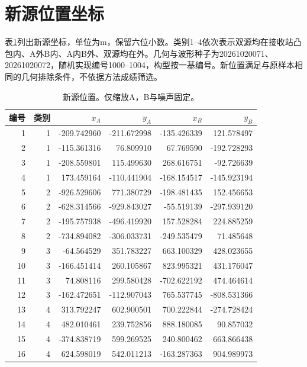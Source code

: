 \documentclass[a4paper,fleqn]{cas-sc}
\begin{document}
\FloatBarrier
\appendix
\FloatBarrier
\section{新源位置坐标}\label{en:coordinates}
表\ref{en:coordinates-table}列出新源坐标，单位为m，保留六位小数。类别1--4依次表示双源均在接收站凸包内、A外B内、A内B外、双源均在外。几何与波形种子为20261020071、20261020072，随机实现编号1000--1004，构型按一基编号。新位置满足与原样本相同的几何排除条件，不依据方法成绩筛选。
\begin{table}[pos=H]\centering
\caption{新源位置。仅缩放A，B与噪声固定。}\label{en:coordinates-table}
\begin{tabular}{@{}rrrrrr@{}}\toprule
编号 & 类别 & $x_A$ & $y_A$ & $x_B$ & $y_B$\\\midrule
1 & 1 & -209.742960 & -211.672998 & -135.426339 & 121.578497\\
2 & 1 & -115.361316 & 76.809910 & 67.769590 & -192.728293\\
3 & 1 & -208.559801 & 115.499630 & 268.616751 & -92.726639\\
4 & 1 & 173.459164 & -110.441904 & -168.154517 & -145.923194\\
5 & 2 & -926.529606 & 771.380729 & -198.481435 & 152.456653\\
6 & 2 & -628.314566 & -929.843027 & -55.519139 & -297.939120\\
7 & 2 & -195.757938 & -496.419920 & 157.528284 & 224.885259\\
8 & 2 & -734.894082 & -306.033731 & -249.535479 & 71.485648\\
9 & 3 & -64.564529 & 351.783227 & 663.100329 & 428.023655\\
10 & 3 & -166.451414 & 260.105867 & 823.995321 & 431.176047\\
11 & 3 & 74.808116 & 299.580428 & -702.622192 & 474.464614\\
12 & 3 & -162.472651 & -112.907043 & 765.537745 & -808.531366\\
13 & 4 & 313.792247 & 602.900501 & 700.222844 & -274.728424\\
14 & 4 & 482.010461 & 239.752856 & 888.180085 & 90.857032\\
15 & 4 & -374.838719 & 599.269525 & 240.800462 & 663.866438\\
16 & 4 & 624.598019 & 542.011213 & -163.287363 & 904.989973\\\bottomrule
\end{tabular}\end{table}
\FloatBarrier


\end{document}
